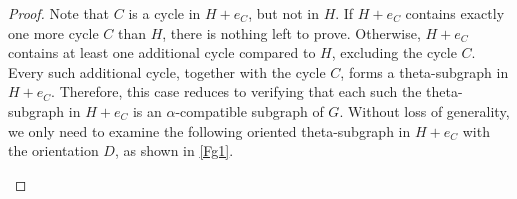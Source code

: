 \documentclass[10pt,a4paper]{amsart}
\def\i{\mbox{\rm (\hspace{0.2mm}i\hspace{0.2mm})}\,}
\begin{document}
\begin{proof}
Note that $C$ is a cycle in $H+e_C$, but not in $H$. If $H+e_C$ contains exactly one more cycle $C$ than $H$, there is nothing left to prove. Otherwise, $H+e_C$ contains at least one additional cycle compared to $H$, excluding the cycle $C$. Every such additional cycle, together with the cycle $C$, forms a theta-subgraph in $H+e_C$. Therefore, this case reduces to verifying that each such the theta-subgraph in $H+e_C$ is an $\alpha$-compatible subgraph of $G$. Without loss of generality, we only need to examine the following oriented theta-subgraph in $H+e_C$ with the orientation $D$, as shown in \autoref{Fg1}.
\begin{figure}[H]
\centering
{}
\end{figure}
\end{proof}
\end{document}
